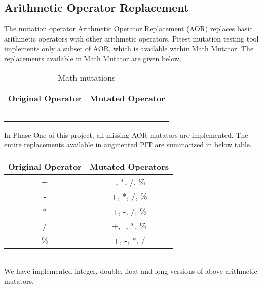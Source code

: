 \subsection{Arithmetic Operator Replacement}
The mutation operator Arithmetic Operator Replacement (AOR) replaces basic arithmetic operators with other arithmetic operators. Pitest mutation testing tool implements only a subset of AOR, which is available within Math Mutator. The replacements available in Math Mutator are given below.\newline


\begin{table}
  \centering
  \begin{tabular}{c c}
    \toprule
    Original Operator & Mutated Operator \\
    \midrule
    \java{+}          & \java{-}         \\
    \java{-}          & \java{+}         \\
    \java{*}          & \java{/}         \\
    \java{/}          & \java{*}         \\
    \java{\%}         & \java{*}         \\
    \bottomrule
  \end{tabular}
  \caption[Math mutations]{Math mutations}
  \label{tab:aor:src_ops}
\end{table}

In Phase One of this project, all missing AOR mutators are implemented. The entire replacements available in augmented PIT are summarized in below table.\\

\begin{tabular}{|c|c|}
	\hline
	Original Operator & Mutated Operators\\
	\hline
    + & -, *, /, \% \\
	\hline
    - & +, *, /, \%\\
	\hline
    * & +, -, /, \%\\
	\hline
    / & +, -, *, \%\\
	\hline
    \% & +, -, *, /\\
	\hline
\end{tabular}\\

We have implemented integer, double, float and long versions of above arithmetic mutators.

